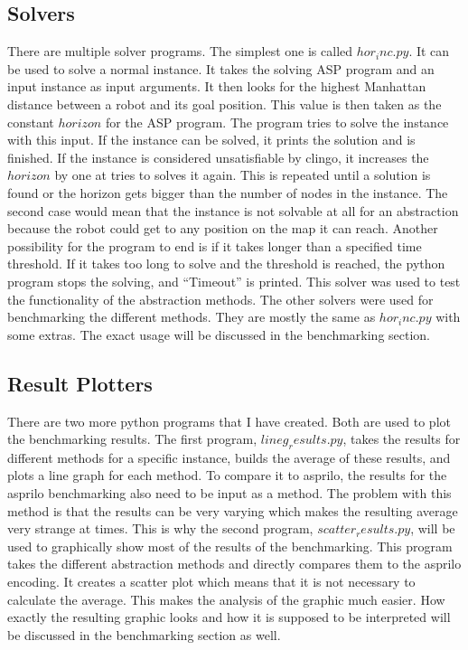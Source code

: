 \documentclass[runningheads]{llncs}
\begin{document}
\subsection{Solvers}
There are multiple solver programs. The simplest one is called $hor_inc.py$. It can be used to solve a normal instance. It takes the solving ASP program and an input instance as input arguments. It then looks for the highest Manhattan distance between a robot and its goal position. This value is then taken as the constant $horizon$ for the ASP program. The program tries to solve the instance with this input. If the instance can be solved, it prints the solution and is finished. If the instance is considered unsatisfiable by clingo, it increases the $horizon$ by one at tries to solves it again. This is repeated until a solution is found or the horizon gets bigger than the number of nodes in the instance. The second case would mean that the instance is not solvable at all for an abstraction because the robot could get to any position on the map it can reach. Another possibility for the program to end is if it takes longer than a specified time threshold. If it takes too long to solve and the threshold is reached, the python program stops the solving, and ``Timeout'' is printed. This solver was used to test the functionality of the abstraction methods. The other solvers were used for benchmarking the different methods. They are mostly the same as $hor_inc.py$ with some extras. The exact usage will be discussed in the benchmarking section.
\subsection{Result Plotters}
There are two more python programs that I have created. Both are used to plot the benchmarking results. The first program, $lineg_results.py$, takes the results for different methods for a specific instance, builds the average of these results, and plots a line graph for each method. To compare it to asprilo, the results for the asprilo benchmarking also need to be input as a method. The problem with this method is that the results can be very varying which makes the resulting average very strange at times. This is why the second program, $scatter_results.py$, will be used to graphically show most of the results of the benchmarking. This program takes the different abstraction methods and directly compares them to the asprilo encoding. It creates a scatter plot which means that it is not necessary to calculate the average. This makes the analysis of the graphic much easier. How exactly the resulting graphic looks and how it is supposed to be interpreted will be discussed in the benchmarking section as well.
\end{document}
